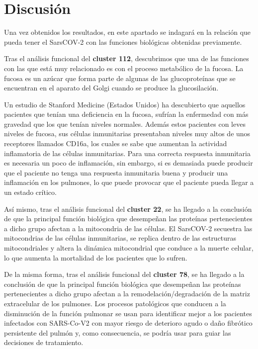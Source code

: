 \section{Discusión}

Una vez obtenidos los resultados, en este apartado se indagará en la relación que pueda tener el SarsCOV-2 con las funciones biológicas obtenidas previamente.

Tras el análisis funcional del \textbf{cluster 112}, descubrimos que una de las funciones con las que está muy relacionado es con el proceso metabólico de la fucosa. La fucosa es un azúcar que forma parte de algunas de las glucoproteínas que se encuentran en el aparato del Golgi cuando se produce la glucosilación.

Un estudio de Stanford Medicine (Estados Unidos) ha descubierto que aquellos pacientes que tenían una deficiencia en la fucosa, sufrían la enfermedad con más gravedad que los que tenían niveles normales. 
Además estos pacientes con leves niveles de fucosa, sus células inmunitarias presentaban niveles muy altos de unos receptores llamados CD16a, los cuales se sabe que aumentan la actividad inflamatoria de las células inmunitarias. 
Para una correcta respuesta inmunitaria es necesaria un poco de inflamación, sin embargo, si es demasiada puede producir que el paciente no tenga una respuesta inmunitaria buena y producir una  inflamación en los pulmones, lo que puede provocar que el paciente pueda llegar a un estado crítico. 

Así mismo, tras el análisis funcional del \textbf{cluster 22}, se ha llegado a la conclusión de que la principal función biológica que desempeñan las proteínas pertenecientes a dicho grupo afectan a la mitocondria de las células. El SarsCOV-2 secuestra las mitocondrias de las células inmunitarias, se replica dentro de las estructuras mitocondriales y altera la dinámica mitocondrial que conduce a la muerte celular, lo que aumenta la mortalidad de los pacientes que lo sufren.

De la misma forma, tras el análisis funcional del \textbf{cluster 78}, se ha llegado a la conclusión de que la principal función biológica que desempeñan las proteínas pertenecientes a dicho grupo afectan a la remodelación/degradación de la matriz extracelular de los pulmones. Los procesos patológicos que conducen a la disminución de la función pulmonar se usan para identificar mejor a los pacientes infectados con SARS-Co-V2 con mayor riesgo de deterioro agudo o daño fibrótico persistente del pulmón y, como consecuencia, se podría usar para guiar las decisiones de tratamiento.
